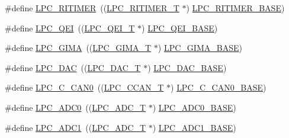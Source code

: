 \begin{DoxyCompactItemize}
\item 
\#define \hyperlink{group___p_e_r_i_p_h__43_x_x___b_a_s_e_gadf02cb70e7eb1a9e85e2b84ec1537fee}{L\+P\+C\+\_\+\+R\+I\+T\+I\+M\+ER}~((\hyperlink{struct_l_p_c___r_i_t_i_m_e_r___t}{L\+P\+C\+\_\+\+R\+I\+T\+I\+M\+E\+R\+\_\+T}          $\ast$) \hyperlink{group___p_e_r_i_p_h__43_x_x___b_a_s_e_ga37e5300b78c57ef9d338291e79610971}{L\+P\+C\+\_\+\+R\+I\+T\+I\+M\+E\+R\+\_\+\+B\+A\+SE})
\item 
\#define \hyperlink{group___p_e_r_i_p_h__43_x_x___b_a_s_e_ga71347b58898f54f8e9f00a6c652c7d49}{L\+P\+C\+\_\+\+Q\+EI}~((\hyperlink{struct_l_p_c___q_e_i___t}{L\+P\+C\+\_\+\+Q\+E\+I\+\_\+T}              $\ast$) \hyperlink{group___p_e_r_i_p_h__43_x_x___b_a_s_e_ga80fa25b18324c10c8e5c26893e6f0a67}{L\+P\+C\+\_\+\+Q\+E\+I\+\_\+\+B\+A\+SE})
\item 
\#define \hyperlink{group___p_e_r_i_p_h__43_x_x___b_a_s_e_ga7f38efebba36596b031c3ca454a05344}{L\+P\+C\+\_\+\+G\+I\+MA}~((\hyperlink{struct_l_p_c___g_i_m_a___t}{L\+P\+C\+\_\+\+G\+I\+M\+A\+\_\+T}             $\ast$) \hyperlink{group___p_e_r_i_p_h__43_x_x___b_a_s_e_ga487598b990a1a910e078773fb461a9f9}{L\+P\+C\+\_\+\+G\+I\+M\+A\+\_\+\+B\+A\+SE})
\item 
\#define \hyperlink{group___p_e_r_i_p_h__43_x_x___b_a_s_e_ga5b94918e9ea326d84ab862a5d377903b}{L\+P\+C\+\_\+\+D\+AC}~((\hyperlink{struct_l_p_c___d_a_c___t}{L\+P\+C\+\_\+\+D\+A\+C\+\_\+T}              $\ast$) \hyperlink{group___p_e_r_i_p_h__43_x_x___b_a_s_e_ga3bbaedad584252212d4704bb419489f6}{L\+P\+C\+\_\+\+D\+A\+C\+\_\+\+B\+A\+SE})
\item 
\#define \hyperlink{group___p_e_r_i_p_h__43_x_x___b_a_s_e_ga0bbe56baee5457d261e664903772406a}{L\+P\+C\+\_\+\+C\+\_\+\+C\+A\+N0}~((\hyperlink{struct_l_p_c___c_c_a_n___t}{L\+P\+C\+\_\+\+C\+C\+A\+N\+\_\+T}             $\ast$) \hyperlink{group___p_e_r_i_p_h__43_x_x___b_a_s_e_gad8ad25cb93a229d94ba1de367cbb1fa3}{L\+P\+C\+\_\+\+C\+\_\+\+C\+A\+N0\+\_\+\+B\+A\+SE})
\item 
\#define \hyperlink{group___p_e_r_i_p_h__43_x_x___b_a_s_e_gabbf7aa3d208a94071e0315856398a6cd}{L\+P\+C\+\_\+\+A\+D\+C0}~((\hyperlink{struct_l_p_c___a_d_c___t}{L\+P\+C\+\_\+\+A\+D\+C\+\_\+T}              $\ast$) \hyperlink{group___p_e_r_i_p_h__43_x_x___b_a_s_e_gaeab1b71ab377bf49f50db80ea0c618a8}{L\+P\+C\+\_\+\+A\+D\+C0\+\_\+\+B\+A\+SE})
\item 
\#define \hyperlink{group___p_e_r_i_p_h__43_x_x___b_a_s_e_gab6013140dd1f4ffdd1575ce747f8bb2b}{L\+P\+C\+\_\+\+A\+D\+C1}~((\hyperlink{struct_l_p_c___a_d_c___t}{L\+P\+C\+\_\+\+A\+D\+C\+\_\+T}              $\ast$) \hyperlink{group___p_e_r_i_p_h__43_x_x___b_a_s_e_ga87b2b5b070b1fa91cf2f2bf243420e7d}{L\+P\+C\+\_\+\+A\+D\+C1\+\_\+\+B\+A\+SE})

\end{DoxyCompactItemize}

